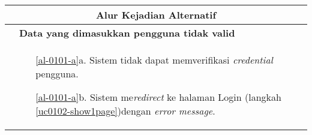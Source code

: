 \begin{table}[H]
\begin{tabular}{|r|p{8cm}|}
		\multicolumn{2}{|c|}{\textbf{Alur Kejadian Alternatif}}                                                         \\ \hline
		\multicolumn{1}{|l|}{}                                           & \textbf{Data yang dimasukkan pengguna tidak valid}
		\\ \hline
		\multicolumn{1}{|l|}{}                                           & 
		\begin{itemize}
			\item[\ref{al-0101-a}a.] Sistem tidak dapat memverifikasi \textit{credential} pengguna.
			\item[\ref{al-0101-a}b.] Sistem me\textit{redirect} ke halaman Login (langkah \ref{uc0102-show1page})dengan \textit{error message}.
		\end{itemize}
		\\ \hline
	\end{tabular}
\end{table}